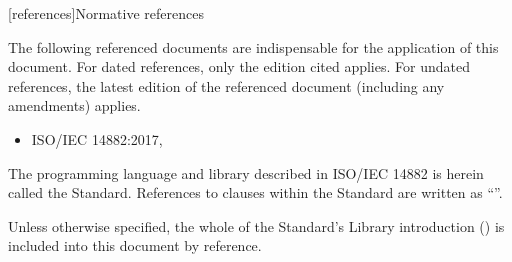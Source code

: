 
[references]{Normative references}

\pnum
The following referenced documents are indispensable for the application of this document. For dated references, only the edition cited applies. For undated references, the latest edition of the referenced document (including any amendments) applies.

\begin{itemize}
\item ISO/IEC 14882:2017, 
\end{itemize}

\pnum
The programming language and library described in ISO/IEC 14882 is herein called the \Cpp Standard.
References to clauses within the \Cpp Standard are written as ``''.

\pnum
Unless otherwise specified, the whole of the \Cpp Standard's Library introduction () is included into this document by reference.

